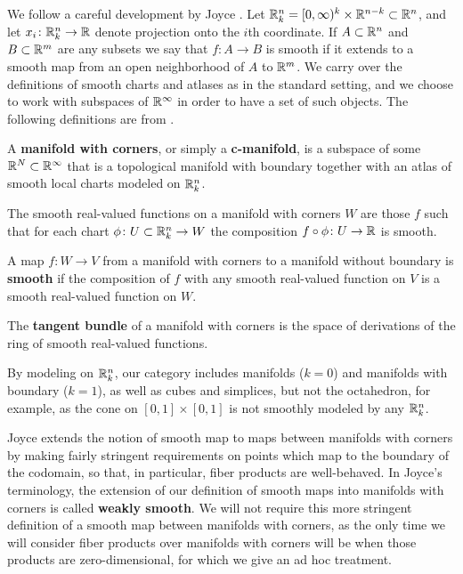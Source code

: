 We follow a careful development by Joyce \cite{Joy12}.
Let $\mathbb{R}^n_k = [0,\infty)^k \times \mathbb{R}^{n-k} \subset \mathbb{R}^n$, and let $x_i \colon \mathbb{R}^n_k \to \mathbb{R}$ denote projection onto the $i$th coordinate.
If $A\subset \mathbb{R}^n$ and $B\subset \mathbb{R}^m$ are any subsets we say that $f:A\to B$ is smooth if it extends to a smooth map from an open neighborhood of $A$ to $\mathbb{R}^m$.
We carry over the definitions of smooth charts and atlases as in the standard setting, and we choose to work with subspaces of $\mathbb{R}^\infty$ in order to have a set of such objects.
The following definitions are from \cite[Section 2]{Joy12}.

\begin{definition}
	A {\bf manifold with corners}, or simply a \textbf{c-manifold}, is a subspace of some $\mathbb{R}^N \subset \mathbb{R}^\infty$ that is a topological manifold with boundary together with an atlas of smooth local charts modeled on $\mathbb{R}^n_k$.

	The smooth real-valued functions on a manifold with corners $W$ are those $f$ such that for each chart $\phi \colon U \subset \mathbb{R}^n_k \to W$ the composition $f \circ \phi \colon U \to \mathbb{R}$ is smooth.

	A map $f \colon W \to V$ from a manifold with corners to a manifold without boundary
	is {\bf smooth} if the composition of $f$ with any smooth real-valued function on $V$ is
	a smooth real-valued function on $W$.

	The {\bf tangent bundle} of a manifold with corners is the space of derivations of the ring of smooth real-valued functions.
\end{definition}

By modeling on $\mathbb{R}^n_k$, our category includes manifolds ($k=0$) and manifolds with boundary ($k=1$), as well as cubes and simplices, but not the octahedron, for example, as the cone on $[0,1] \times [0,1]$ is not smoothly modeled by any $\mathbb{R}^n_k$.

Joyce extends the notion of smooth map to maps between manifolds with corners by making fairly stringent requirements on points which map to the boundary of the codomain, so that, in particular, fiber products are well-behaved.
In Joyce's terminology, the extension of our definition of smooth maps into manifolds with corners is called {\bf weakly smooth}.
We will not require this more stringent definition of a smooth map between manifolds with corners, as the only time we will consider fiber products over manifolds with corners will be when those products are zero-dimensional, for which we give an ad hoc treatment.

